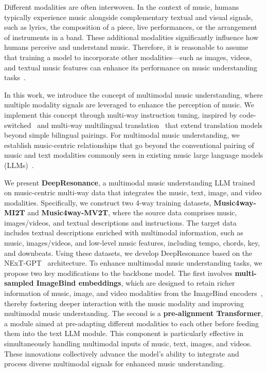 Different modalities are often interwoven. In the context of music, humans typically experience music alongside complementary textual and visual signals, such as lyrics, the composition of a piece, live performances, or the arrangement of instruments in a band. These additional modalities significantly influence how humans perceive and understand music. Therefore, it is reasonable to assume that training a model to incorporate other modalities—such as images, videos, and textual music features can enhance its performance on music understanding tasks~\cite{DBLP:conf/ijcnn/MancoBQF21,DBLP:conf/icml/GardnerDSB24,DBLP:journals/corr/abs-2301-11325,DBLP:conf/icassp/LiuHSS24}.

In this work, we introduce the concept of multimodal music understanding, where multiple modality signals are leveraged to enhance the perception of music. We implement this concept through multi-way instruction tuning, inspired by code-switched~\cite{DBLP:conf/iclr/SongZQXCWL22} and multi-way multilingual translation~\cite{DBLP:journals/jmlr/FanBSMEGBCWCGBL21} that extend translation models beyond simple bilingual pairings. For multimodal music understanding, we establish music-centric relationships that go beyond the conventional pairing of music and text modalities commonly seen in existing music large language models (LLMs)~\cite{DBLP:conf/ismir/DohCLN23,DBLP:conf/icassp/LiuHSS24,DBLP:journals/corr/abs-2311-11255,DBLP:conf/icml/GardnerDSB24,DBLP:journals/corr/abs-2410-15573}.

We present \textbf{DeepResonance}, a multimodal music understanding LLM trained on music-centric multi-way data that integrates the music, text, image, and video modalities. Specifically, we construct two 4-way training datasets, \textbf{Music4way-MI2T} and \textbf{Music4way-MV2T}, where the source data comprises music, images/videos, and textual descriptions and instructions. The target data includes textual descriptions enriched with multimodal information, such as music, images/videos, and low-level music features, including tempo, chords, key, and downbeats. Using these datasets, we develop DeepResonance based on the NExT-GPT~\cite{DBLP:conf/icml/Wu0Q0C24} architecture. To enhance multimodal music understanding tasks, we propose two key modifications to the backbone model. The first involves \textbf{multi-sampled ImageBind embeddings}, which are designed to retain richer information of music, image, and video modalities from the ImageBind encoders~\cite{DBLP:conf/cvpr/GirdharELSAJM23}, thereby fostering deeper interaction with the music modality and improving multimodal music understanding. The second is a \textbf{pre-alignment Transformer}, a module aimed at pre-adapting different modalities to each other before feeding them into the text LLM module. This component is particularly effective in simultaneously handling multimodal inputs of music, text, images, and videos. These innovations collectively advance the model's ability to integrate and process diverse multimodal signals for enhanced music understanding.

